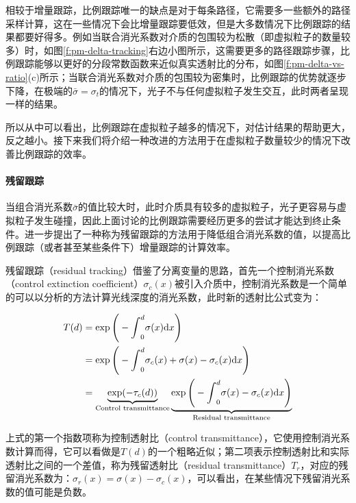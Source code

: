 相较于增量跟踪，比例跟踪唯一的缺点是对于每条路径，它需要多一些额外的路径采样计算，这在一些情况下会比增量跟踪要低效，但是大多数情况下比例跟踪的结果都要好得多。例如当联合消光系数对介质的包围较为松散（即虚拟粒子的数量较多）时，如图\ref{f:pm-delta-tracking}右边小图所示，这需要更多的路径跟踪步骤，比例跟踪能够以更好的分段常数函数来近似真实透射比的分布，如图\ref{f:pm-delta-vs-ratio}(c)所示；当联合消光系数对介质的包围较为密集时，比例跟踪的优势就逐步下降，在极端的$\bar{\sigma}=\sigma_t$的情况下，光子不与任何虚拟粒子发生交互，此时两者呈现一样的结果。

所以从中可以看出，比例跟踪在虚拟粒子越多的情况下，对估计结果的帮助更大，反之越小。接下来我们将介绍一种改进的方法用于在虚拟粒子数量较少的情况下改善比例跟踪的效率。




\paragraph{残留跟踪}
当组合消光系数$\bar{\sigma}$的值比较大时，此时介质具有较多的虚拟粒子，光子更容易与虚拟粒子发生碰撞，因此上面讨论的比例跟踪需要经历更多的尝试才能达到终止条件。\cite{a:ResidualRatioTrackingforEstimatingAttenuationinParticipatingMedia}进一步提出了一种称为残留跟踪的方法用于降低组合消光系数的值，以提高比例跟踪（或者甚至某些条件下）增量跟踪的计算效率。

残留跟踪（residual tracking）借鉴了分离变量的思路，首先一个控制消光系数（control extinction coefficient）$\sigma_c(x)$被引入介质中，控制消光系数是一个简单的可以以分析的方法计算光线深度的消光系数，此时新的透射比公式变为：

\begin{equation}\label{e:pm-residual}
\begin{aligned}
	T(d)&=\exp\Bigg(-{\rm \int}^{d}_0\sigma(x){\rm d}x\Bigg)\\
	&=\exp\Bigg(-{\rm \int}^{d}_0\sigma_c(x)+\sigma(x)-\sigma_c(x){\rm d}x\Bigg)\\	
	&=\underbrace{\exp(-\tau_c(d))}_{\text{Control transmittance}}\underbrace{\exp\Bigg(-{\rm \int}^{d}_0\sigma(x)-\sigma_c(x){\rm d}x\Bigg)}_{\text{Residual transmittance}}
\end{aligned}
\end{equation}

上式的第一个指数项称为控制透射比（control transmittance），它使用控制消光系数计算而得，它可以看做是$T(d)$的一个粗略近似；第二项表示控制透射比和实际透射比之间的一个差值，称为残留透射比（residual transmittance）$T_r$，对应的残留消光系数为：$\sigma_r(x)=\sigma(x)-\sigma_c(x)$，可以看出，在某些情况下残留消光系数的值可能是负数。

